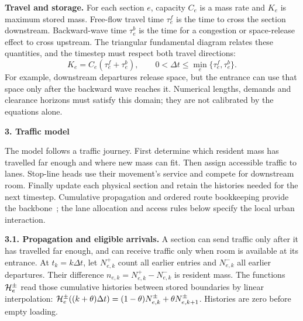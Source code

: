 \documentclass[10pt,a4paper]{article}
\newcommand{\head}[1]{\par\vspace{4pt}\noindent\textbf{#1}\par\nobreak\vspace{1pt}}
\begin{document}
\begin{samepage}
\textbf{Travel and storage.} For each section $e$, capacity $C_e$ is a
mass rate and $K_e$ is maximum stored mass. Free-flow travel time
$\tau^f_e$ is the time to cross the section downstream. Backward-wave
time $\tau^b_e$ is the time for a congestion or space-release effect to
cross upstream. The triangular fundamental diagram relates these
quantities, and the timestep must respect both travel directions:
\begin{equation}
 K_e=C_e(\tau^f_e+\tau^b_e),\qquad
 0<\Delta t\leq\min_e\{\tau^f_e,\tau^b_e\}.
 \label{eq:compact-domain}
\end{equation}
For example, downstream departures release space, but the entrance can
use that space only after the backward wave reaches it. Numerical
lengths, demands and clearance horizons must satisfy this domain;
they are not calibrated by the equations alone.
\par\end{samepage}

\head{3. Traffic model}
The model follows a traffic journey. First determine which resident
mass has travelled far enough and where new mass can fit. Then assign
accessible traffic to lanes. Stop-line heads use their movement's service
and compete for downstream room. Finally update each physical section
and retain the histories needed for the next timestep.
Cumulative propagation and ordered route bookkeeping provide the
backbone~\cite{m0,m1}; the lane allocation and access rules below specify
the local urban interaction.

\textbf{3.1. Propagation and eligible arrivals.}
A section can send traffic only after it has travelled far enough, and
can receive traffic only when room is available at its entrance.
At $t_k=k\Delta t$, let $N^+_{e,k}$ count all earlier entries and
$N^-_{e,k}$ all earlier departures. Their difference
$n_{e,k}=N^+_{e,k}-N^-_{e,k}$ is resident mass.
The functions ${\cal H}^{\pm}_e$ read those cumulative histories between
stored boundaries by linear interpolation:
${\cal H}^{\pm}_e((k+\theta)\Delta t)
=(1-\theta)N^\pm_{e,k}+\theta N^\pm_{e,k+1}$.
Histories are zero before empty loading.
\end{document}
